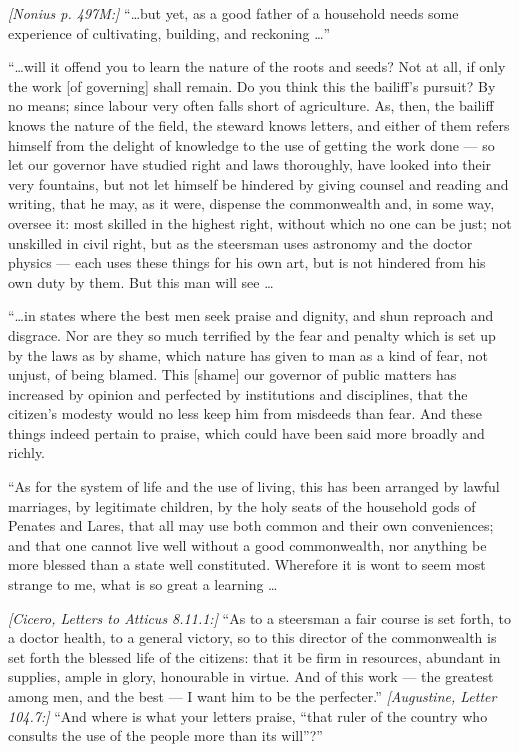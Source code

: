  \textit{[Nonius p. 497M:]} ``\ldots but yet, as a good father of a household needs some experience of cultivating, building, and reckoning \ldots''

 ``\ldots will it offend you to learn the nature of the roots and seeds? Not at all, if only the work [of governing] shall remain. Do you think this the bailiff's pursuit? By no means; since labour very often falls short of agriculture. As, then, the bailiff knows the nature of the field, the steward knows letters, and either of them refers himself from the delight of knowledge to the use of getting the work done --- so let our governor have studied right and laws thoroughly, have looked into their very fountains, but not let himself be hindered by giving counsel and reading and writing, that he may, as it were, dispense the commonwealth and, in some way, oversee it: most skilled in the highest right, without which no one can be just; not unskilled in civil right, but as the steersman uses astronomy and the doctor physics --- each uses these things for his own art, but is not hindered from his own duty by them. But this man will see \ldots

 ``\ldots in states where the best men seek praise and dignity, and shun reproach and disgrace. Nor are they so much terrified by the fear and penalty which is set up by the laws as by shame, which nature has given to man as a kind of fear, not unjust, of being blamed. This [shame] our governor of public matters has increased by opinion and perfected by institutions and disciplines, that the citizen's modesty would no less keep him from misdeeds than fear. And these things indeed pertain to praise, which could have been said more broadly and richly.

 ``As for the system of life and the use of living, this has been arranged by lawful marriages, by legitimate children, by the holy seats of the household gods of Penates and Lares, that all may use both common and their own conveniences; and that one cannot live well without a good commonwealth, nor anything be more blessed than a state well constituted. Wherefore it is wont to seem most strange to me, what is so great a learning \ldots

 \textit{[Cicero, Letters to Atticus 8.11.1:]} ``As to a steersman a fair course is set forth, to a doctor health, to a general victory, so to this director of the commonwealth is set forth the blessed life of the citizens: that it be firm in resources, abundant in supplies, ample in glory, honourable in virtue. And of this work --- the greatest among men, and the best --- I want him to be the perfecter.'' \textit{[Augustine, Letter 104.7:]} ``And where is what your letters praise, ``that ruler of the country who consults the use of the people more than its will''?''

